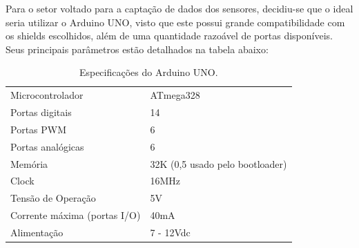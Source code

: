 	Para o setor voltado para a captação de dados dos sensores, decidiu-se que o ideal seria utilizar o Arduino UNO, visto que este possui grande compatibilidade com os shields escolhidos, além de uma quantidade razoável de portas disponíveis. Seus principais parâmetros estão detalhados na tabela abaixo:

	\begin{table}[h!]
		\centering
		\begin{tabular}{l|l}
			\toprule
			Microcontrolador & ATmega328 \\
			Portas digitais & 14 \\
			Portas PWM & 6 \\
			Portas analógicas & 6 \\
			Memória & 32K (0,5 usado pelo bootloader) \\
			Clock & 16MHz \\
			Tensão de Operação & 5V \\
			Corrente máxima (portas I/O) & 40mA \\
			Alimentação & 7 - 12Vdc \\
			\bottomrule
		\end{tabular}
		\caption{Especificações do Arduino UNO.}
		\label{tab:arduino}
	\end{table}
